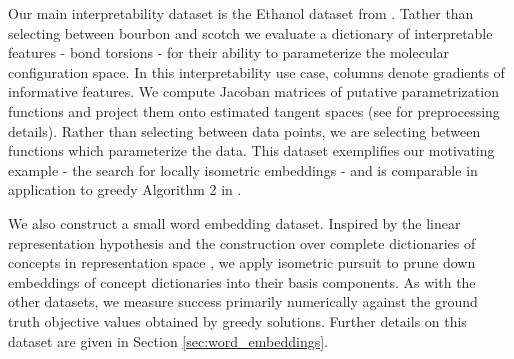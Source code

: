 Our main interpretability dataset is the Ethanol dataset from \citet{Chmiela2018-at, Koelle2022-ju}.
Tather than selecting between bourbon and scotch we evaluate a dictionary of interpretable features  - bond torsions - for their ability to parameterize the molecular configuration space.
In this interpretability use case, columns denote gradients of informative features.
We compute Jacoban matrices of putative parametrization functions and project them onto estimated tangent spaces (see \citet{Koelle2022-ju} for preprocessing details).
Rather than selecting between data points, we are selecting between functions which parameterize the data.
This dataset exemplifies our motivating example - the search for locally isometric embeddings - and is comparable in application to greedy Algorithm 2 in \citet{Kohli2021}.

We also construct a small word embedding dataset.
Inspired by the linear representation hypothesis \citep{Park2023-hq,Mikolov2013-lt } and the construction over complete dictionaries of concepts in representation space \citep{templeton2024scaling, Makelov2024-bw}, we apply isometric pursuit to prune down embeddings of concept dictionaries into their basis components.
As with the other datasets, we measure success primarily numerically against the ground truth objective values obtained by greedy solutions.
Further details on this dataset are given in Section \ref{sec:word_embeddings}.

